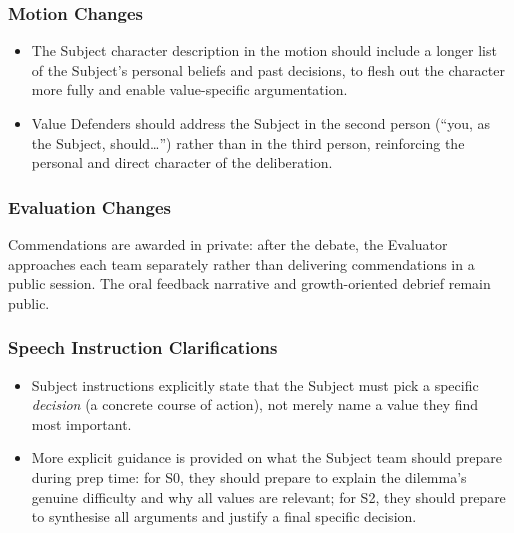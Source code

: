 \subsubsection{Motion Changes}

\begin{itemize}
    \item The Subject character description in the motion should include a longer list of the Subject's personal beliefs and past decisions, to flesh out the character more fully and enable value-specific argumentation.
    \item Value Defenders should address the Subject in the second person (``you, as the Subject, should\ldots'') rather than in the third person, reinforcing the personal and direct character of the deliberation.
\end{itemize}

\subsubsection{Evaluation Changes}

Commendations are awarded in private: after the debate, the Evaluator approaches each team separately rather than delivering commendations in a public session. The oral feedback narrative and growth-oriented debrief remain public.

\subsubsection{Speech Instruction Clarifications}

\begin{itemize}
    \item Subject instructions explicitly state that the Subject must pick a specific \textit{decision} (a concrete course of action), not merely name a value they find most important.
    \item More explicit guidance is provided on what the Subject team should prepare during prep time: for S0, they should prepare to explain the dilemma's genuine difficulty and why all values are relevant; for S2, they should prepare to synthesise all arguments and justify a final specific decision.
\end{itemize}


\newpage
